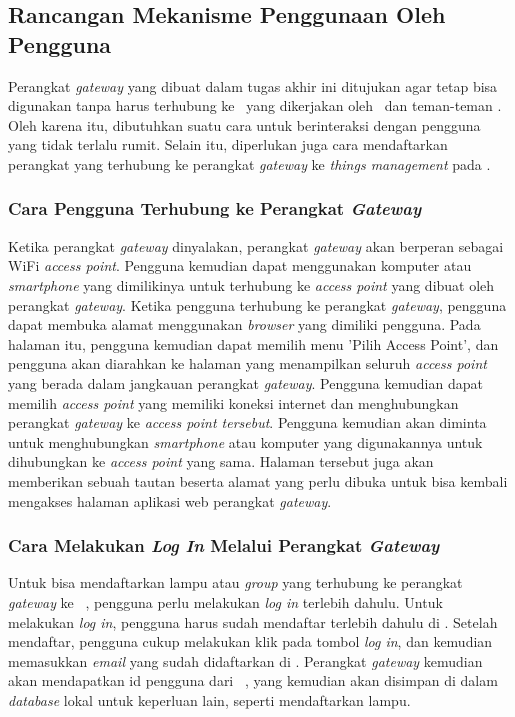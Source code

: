 \subsection{Rancangan Mekanisme Penggunaan Oleh Pengguna}
Perangkat \textit{gateway} yang dibuat dalam tugas akhir ini ditujukan agar tetap bisa digunakan tanpa harus terhubung ke \plat~yang dikerjakan oleh \saya~dan teman-teman \saya. Oleh karena itu, dibutuhkan suatu cara untuk berinteraksi dengan pengguna yang tidak terlalu rumit. Selain itu, diperlukan juga cara mendaftarkan perangkat yang terhubung ke perangkat \textit{gateway} ke \textit{things management} pada \plat.

\subsubsection{Cara Pengguna Terhubung ke Perangkat \textit{Gateway}}
Ketika perangkat \textit{gateway} dinyalakan, perangkat \textit{gateway} akan berperan sebagai WiFi \textit{access point}. Pengguna kemudian dapat menggunakan komputer atau \textit{smartphone} yang dimilikinya untuk terhubung ke \textit{access point} yang dibuat oleh perangkat \textit{gateway}. Ketika pengguna terhubung ke perangkat \textit{gateway}, pengguna dapat membuka alamat  menggunakan \textit{browser} yang dimiliki pengguna. Pada halaman itu, pengguna kemudian dapat memilih menu 'Pilih Access Point', dan pengguna akan diarahkan ke halaman yang menampilkan seluruh \textit{access point} yang berada dalam jangkauan perangkat \textit{gateway}. Pengguna kemudian dapat memilih \textit{access point} yang memiliki koneksi internet dan menghubungkan perangkat \textit{gateway} ke \textit{access point tersebut}. Pengguna kemudian akan diminta untuk menghubungkan \textit{smartphone} atau komputer yang digunakannya untuk dihubungkan ke \textit{access point} yang sama. Halaman tersebut juga akan memberikan sebuah tautan beserta alamat yang perlu dibuka untuk bisa kembali mengakses halaman aplikasi web perangkat \textit{gateway}.

\subsubsection{Cara Melakukan \textit{Log In} Melalui Perangkat \textit{Gateway}}
Untuk bisa mendaftarkan lampu atau \textit{group} yang terhubung ke perangkat \textit{gateway} ke \plat~, pengguna perlu melakukan \textit{log in} terlebih dahulu. Untuk melakukan \textit{log in}, pengguna harus sudah mendaftar terlebih dahulu di \plat. Setelah mendaftar, pengguna cukup melakukan klik pada tombol \textit{log in}, dan kemudian memasukkan \textit{email} yang sudah didaftarkan di \plat. Perangkat \textit{gateway} kemudian akan mendapatkan id pengguna dari \plat~, yang kemudian akan disimpan di dalam \textit{database} lokal untuk keperluan lain, seperti mendaftarkan lampu.

